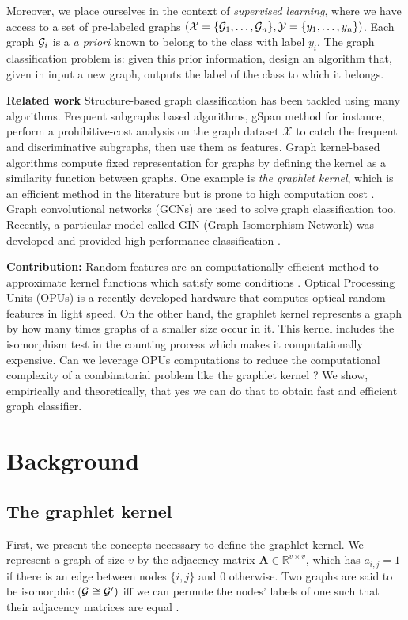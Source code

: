 \documentclass{article}
\begin{document}
Moreover, we place ourselves in the context of \emph{supervised learning}, where we have access to a set of pre-labeled graphs $(\mathcal{X}=\{\mathcal{G}_1,\ldots,\mathcal{G}_n\}, \mathcal{Y}=\{y_1,\ldots,y_n\})$. Each graph $\mathcal{G}_i$ is a \emph{a priori} known to belong to the class with label $y_i$. The graph classification problem is: given this prior information, design an algorithm that, given in input a new graph, outputs the label of the class to which it belongs.  \BlankLine

\noindent \textbf{Related work}
Structure-based graph classification has been tackled using many algorithms. Frequent subgraphs based algorithms, gSpan method \cite{frequent_subgraphs} for instance, perform a prohibitive-cost analysis on the graph dataset $\mathcal{X}$ to catch the frequent and discriminative subgraphs, then use them as features. Graph kernel-based algorithms \cite{kriege_graph_kernels} compute fixed representation for graphs by defining the kernel as a similarity function between graphs. One example is \emph{the graphlet kernel}, which is an efficient method in the literature but is prone to high computation cost \cite{graphlet_kernel}.
Graph convolutional networks (GCNs) are used to solve graph classification too. Recently, a particular model called GIN (Graph Isomorphism Network) was developed and provided high performance classification \cite{GCN_powerful}. \BlankLine

\noindent\textbf{Contribution:} Random features are an computationally efficient method to approximate kernel functions which satisfy some conditions \cite{RF_1}. Optical Processing Units (OPUs) is a recently developed hardware that computes optical random features in light speed. On the other hand, the graphlet kernel represents a graph by how many times graphs of a smaller size occur in it. This kernel includes the isomorphism test in the counting process which makes it computationally expensive. Can we leverage OPUs computations to reduce the computational complexity of a combinatorial problem like the graphlet kernel ? We show, empirically and theoretically, that yes we can do that to obtain fast and efficient graph classifier. 

\section{Background}
\label{sec:background}
\subsection{The graphlet kernel}\label{sec:graphlet_kernel}
First, we present the concepts necessary to define the graphlet kernel. We represent a graph  of size $v$ by the adjacency matrix $\mathbf{A}\in \mathbb{R}^{v\times v}$,  which has $a_{i,j} =1$ if there is an edge between nodes $\{i,j\}$ and $0$ otherwise. Two graphs are said to be isomorphic ($\mathcal{G}\cong \mathcal{G}')$ iff we can permute the nodes' labels of one such that their adjacency matrices are equal \cite{isomorphism}. 
\end{document}
